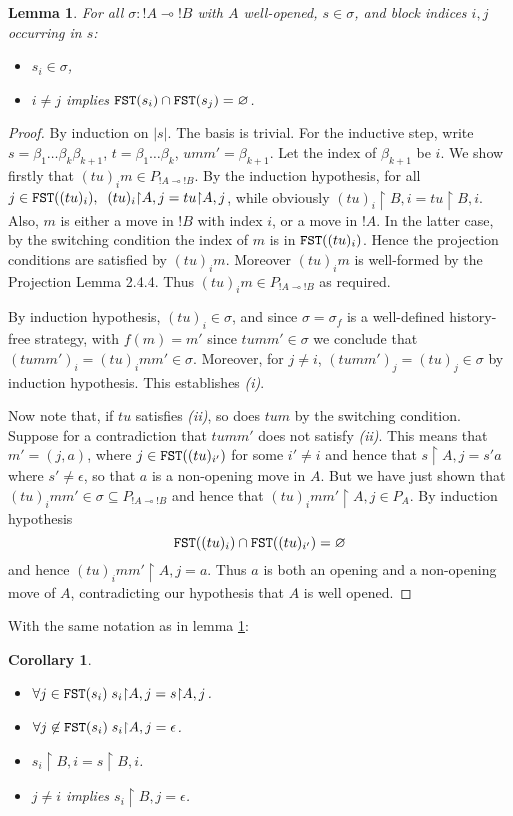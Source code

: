 \documentclass[11pt]{article}
\newtheorem{lemma}[theorem]{Lemma}
\newtheorem{corollary}[theorem]{Corollary}
\newcommand{\ITEM}[1]{\begin{itemize} #1 \end{itemize}}
\newcommand{\Rest}{{\upharpoonright}}
\newcommand{\linimpl}{\mbox{$\multimap$}}
\newcommand{\varempty}{\varnothing}
\begin{document}
\begin{lemma}\label{disblock}
 For all $\sigma:!A\linimpl !B$ with $A$ well-opened, $s\in\sigma$,
 and block indices $i,j$ occurring in $s$:
\ITEM{
\item[(i)] $s_i\in\sigma$,
\item[(ii)] $i\neq j$ implies ${\tt FST}(s_i)\cap {\tt FST}(s_j)=\varempty$.
}
\end{lemma}
\begin{proof} By induction on $|s|$. The basis is trivial. For the
inductive step, write $s=\beta_1\dots\beta_k \beta_{k+1}$,
$t=\beta_1\dots\beta_k$, $umm'=\beta_{k+1}$. Let the index of
$\beta_{k+1}$ be $i$. We show firstly that $(tu)_im\in
P_{!A\linimpl
  !B}$. By the induction hypothesis, for all $j\in {\tt FST}((tu)_i),\; \;
(tu)_i\Rest A{,j}=tu\Rest A{,j}$, while obviously $(tu)_i\Rest
B{,i}=tu\Rest B{,i}$.
Also, $m$ is either a move in $!B$ with index $i$, or a move in
$!A$. In the latter case, by the switching condition the index of $m$
is in ${\tt FST}((tu)_i)$.
Hence the projection conditions are satisfied
by $(tu)_im$. Moreover $(tu)_im$ is well-formed by the Projection Lemma
2.4.4.
Thus $(tu)_im\in P_{!A \linimpl !B}$ as required.

By induction hypothesis, $(tu)_i\in\sigma$, and since
$\sigma=\sigma_f$ is a well-defined history-free strategy, with
$f(m)=m'$ since $tumm'\in\sigma$ we conclude that
$(tumm')_i=(tu)_imm'\in\sigma$. Moreover, for $j\neq i$,
$(tumm')_j=(tu)_j\in\sigma$ by induction hypothesis. This establishes
{\it (i)}.

Now note that, if $tu$ satisfies {\it (ii)}, so does $tum$ by the
switching condition. Suppose for a contradiction that $tumm'$ does
not satisfy {\it (ii)}. This means that $m'=(j,a)$, where $j\in
{\tt FST}((tu)_{i'})$ for some $i'\neq i$ and hence that $s\Rest
A{,j} = s'a$ where $s'\neq\epsilon$, so that $a$ is a non-opening
move in $A$. But we have just shown that $(tu)_i mm'\in\sigma
\subseteq P_{!A\linimpl !B}$ and hence that $(tu)_i mm' \Rest
A{,j}\in P_A$. By induction hypothesis $$ {\tt FST}((tu)_i)\cap
{\tt FST}((tu)_{i'}) =\varempty$$ and hence $(tu)_imm' \Rest
A{,j}=a$. Thus $a$ is both an opening and a non-opening move of
$A$, contradicting our hypothesis that $A$ is well opened.
\end{proof}

With the same notation as in lemma \ref{disblock}:

\begin{corollary}\label{cordisblock}
\begin{itemize}
\item[(i)] $\forall j\in {\tt FST}(s_i) \; s_i\Rest A{,j} =s\Rest A{,j}$.
\item[(ii)] $\forall j\not\in {\tt FST}(s_i) \; s_i\Rest A{,j}=\epsilon$.
\item[(iii)] $s_i\Rest B{,i}=s\Rest B{,i}$.
\item[(iv)] $j\neq i$ implies $s_i\Rest B{,j}=\epsilon$.
\end{itemize}
\end{corollary}
\end{document}
